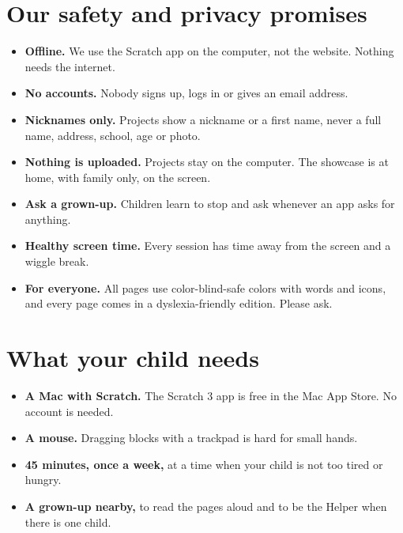 \documentclass[track=junior,level=1]{kidscode}
\begin{document}
\section{Our safety and privacy promises}
\begin{safety}
\begin{itemize}[itemsep=2pt]
  \item \textbf{Offline.} We use the Scratch app on the computer, not the website. Nothing needs the internet.
  \item \textbf{No accounts.} Nobody signs up, logs in or gives an email address.
  \item \textbf{Nicknames only.} Projects show a nickname or a first name, never a full name,
        address, school, age or photo.
  \item \textbf{Nothing is uploaded.} Projects stay on the computer. The showcase is at home, with
        family only, on the screen.
  \item \textbf{Ask a grown-up.} Children learn to stop and ask whenever an app asks for anything.
  \item \textbf{Healthy screen time.} Every session has time away from the screen and a wiggle break.
  \item \textbf{For everyone.} All pages use color-blind-safe colors with words and icons, and every
        page comes in a dyslexia-friendly edition. Please ask.
\end{itemize}
\end{safety}

\section{What your child needs}
\begin{itemize}[itemsep=2pt]
  \item \textbf{A Mac with Scratch.} The Scratch 3 app is free in the Mac App Store. No account is needed.
  \item \textbf{A mouse.} Dragging blocks with a trackpad is hard for small hands.
  \item \textbf{45 minutes, once a week,} at a time when your child is not too tired or hungry.
  \item \textbf{A grown-up nearby,} to read the pages aloud and to be the Helper when there is one child.
\end{itemize}
\end{document}

